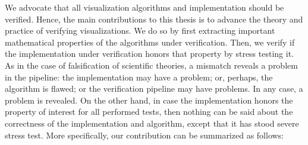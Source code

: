 We advocate that all visualization algorithms and implementation should be verified.
Hence, the main contributions to this thesis is to advance the theory and practice of verifying visualizations. We do so by first extracting important mathematical properties of the algorithms under verification. Then, we verify if the implementation under verification honors that property by stress testing it. As in the case of falsification of scientific theories, a mismatch reveals a problem in the pipeline: the implementation may have a problem; or, perhaps, the algorithm is flawed; or the verification pipeline may have problems. In any case, a problem is revealed. On the other hand, in case the implementation honors the property of interest for all performed tests, then nothing can be said about the correctness of the implementation and algorithm, except that it has stood severe stress test. More specifically, our contribution can be summarized as follows:
